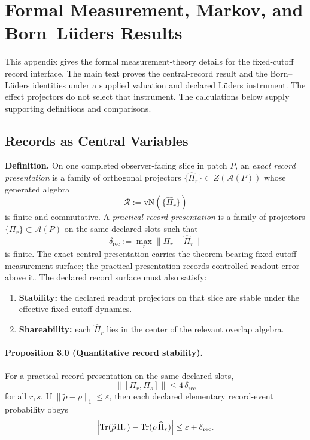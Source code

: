 \section{Formal Measurement, Markov, and Born--L\"uders Results}
\label{app:microphysics-measurement-ledger}

This appendix gives the formal measurement-theory details for the
fixed-cutoff record interface. The main text proves the central-record result
and the Born--L\"uders identities under a supplied valuation and declared
L\"uders instrument. The effect projectors do not select that instrument. The
calculations below supply supporting definitions and comparisons.

\subsection{Records as Central Variables}

\textbf{Definition.} On one completed observer-facing slice in patch \(P\), an \emph{exact record
presentation} is a family of orthogonal projectors
\(\{\widehat\Pi_r\}\subset Z(\mathcal A(P))\) whose generated algebra
\[
\mathcal R:=\mathrm{vN}(\{\widehat\Pi_r\})
\]
is finite and commutative. A \emph{practical record presentation} is a family of projectors
\(\{\Pi_r\}\subset\mathcal A(P)\) on the same declared slots such that
\[
\delta_{\mathrm{rec}}:=\max_r \|\Pi_r-\widehat\Pi_r\|
\]
is finite. The exact central presentation carries the theorem-bearing fixed-cutoff measurement
surface; the practical presentation records controlled readout error above it. The declared record
surface must also satisfy:
\begin{enumerate}[leftmargin=2em]
\item \textbf{Stability:} the declared readout projectors on that slice are stable under the effective fixed-cutoff dynamics.
\item \textbf{Shareability:} each \(\widehat\Pi_r\) lies in the center of the relevant overlap algebra.
\end{enumerate}

\paragraph{\textbf{Proposition 3.0 (Quantitative record stability).}}
For a practical record presentation on the same declared slots,
\[
\|[\Pi_r,\Pi_s]\|\le 4\,\delta_{\mathrm{rec}}
\]
for all \(r,s\). If \(\|\widetilde\rho-\rho\|_1\le\varepsilon\), then each declared elementary
record-event probability obeys
\[
\Bigl|
\operatorname{Tr}(\widetilde\rho\,\Pi_r)
-
\operatorname{Tr}(\rho\,\widehat\Pi_r)
\Bigr|
\le
\varepsilon+\delta_{\mathrm{rec}}.
\]

